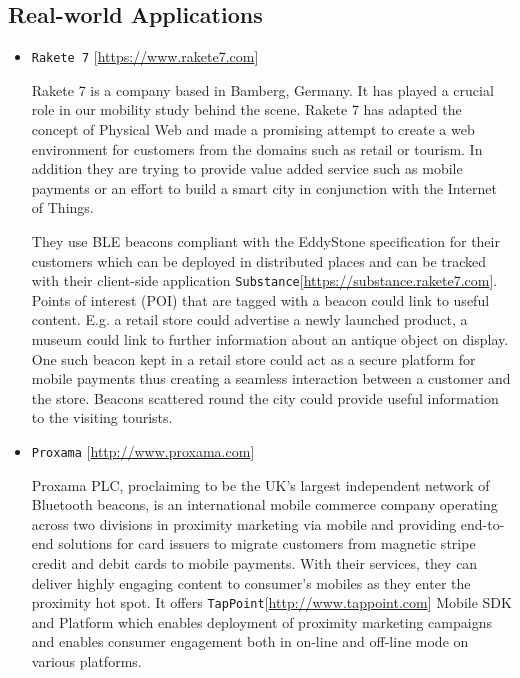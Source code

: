 \subsection{Real-world Applications}

\begin{itemize}
	\item \texttt{Rakete 7\cite{Rakete7}} [\url{https://www.rakete7.com}]
	
	Rakete 7 is a company based in Bamberg, Germany. It has played a crucial role in our mobility study behind the scene. Rakete 7 has adapted the concept of Physical Web and made a promising attempt to create a web environment for customers from the domains such as retail or tourism. In addition they are trying to provide value added service such as mobile payments or an effort to build a smart city in conjunction with the Internet of Things. 
	
	They use BLE beacons compliant with the EddyStone specification for their customers which can be deployed in distributed places and can be tracked with their client-side application \texttt{Substance\cite{Rakete7Substance}}[\url{https://substance.rakete7.com}]. Points of interest (POI) that are tagged with a beacon could link to useful content. E.g. a retail store could advertise a newly launched product, a museum could link to further information about an antique object on display. One such beacon kept in a retail store could act as a secure platform for mobile payments thus creating a seamless interaction between a customer and the store. Beacons scattered round the city could provide useful information to the visiting tourists.
	
	\item \texttt{Proxama\cite{Proxama}}  [\url{http://www.proxama.com}]
	
	Proxama PLC, proclaiming to be the UK's largest independent network of Bluetooth beacons,  is an international mobile commerce company operating across two divisions in proximity marketing via mobile and providing end-to-end solutions for card issuers to migrate customers from magnetic stripe credit and debit cards to mobile payments. With their services, they can deliver highly engaging content to consumer’s mobiles as they enter the proximity hot spot. It offers \texttt{TapPoint\cite{ProxamaTapPoint}}[\url{http://www.tappoint.com}] Mobile SDK and Platform which enables deployment of proximity marketing campaigns and enables consumer engagement both in on-line and off-line mode on various platforms.
	

\end{itemize}
